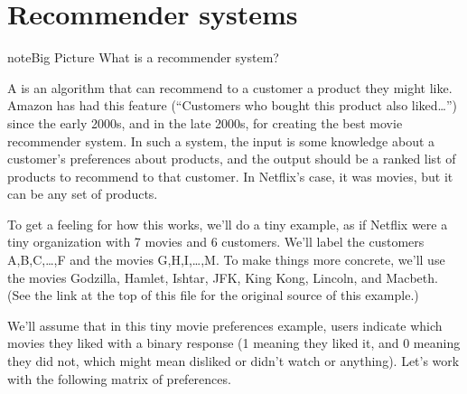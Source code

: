 \documentclass[letterpaper,10pt,english]{sphinxmanual}
\begin{document}
\section{Recommender systems}
\label{\detokenize{chapter-16-matrices:recommender-systems}}
\begin{sphinxadmonition}{note}{Big Picture \sphinxhyphen{} What is a recommender system?}

A  is an algorithm that can recommend to a customer a product they might like.  Amazon has had this feature (“Customers who bought this product also liked…”) since the early 2000s, and in the late 2000s,  for creating the best movie recommender system.  In such a system, the input is some knowledge about a customer’s preferences about products, and the output should be a ranked list of products to recommend to that customer.  In Netflix’s case, it was movies, but it can be any set of products.
\end{sphinxadmonition}

To get a feeling for how this works, we’ll do a tiny example, as if Netflix were a tiny organization with 7 movies and 6 customers.  We’ll label the customers A,B,C,…,F and the movies G,H,I,…,M.  To make things more concrete, we’ll use the movies Godzilla, Hamlet, Ishtar, JFK, King Kong, Lincoln, and Macbeth.  (See the link at the top of this file for the original source of this example.)

We’ll assume that in this tiny movie preferences example, users indicate which movies they liked with a binary response (1 meaning they liked it, and 0 meaning they did not, which might mean disliked or didn’t watch or anything).  Let’s work with the following matrix of preferences.
\end{document}
